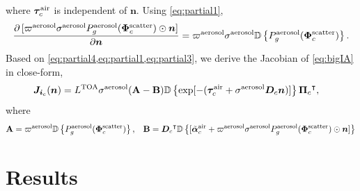 \documentclass[10pt,letterpaper]{article}
\newcommand{\abbrev}[1]{\rm{#1}}
\newcommand{\PartDeriv}[2]{\frac{\partial{#1}}{\partial{#2}}}
\newcommand{\vect}[1]{\bm{#1}}
\newcommand{\transpose}[1]{{#1}^\intercal}
\newcommand{\OpDiag}[1]{\mathbb{D}\left\{#1\right\}}
\begin{document}
where $\vect{\tau}_c^{\rm air}$ is independent of ${\bm n}$. Using
\cref{eq:partial1},
\begin{align}
  \label{eq:partial3}
  \PartDeriv{\, [\varpi^{\rm aerosol}\sigma^{\rm aerosol} P^{\rm
      aerosol}_g(\vect{\Phi}^{\rm scatter}_c) \odot{\bm n}]}{\vect{n}}
  = \varpi^{\rm aerosol}\sigma^{\rm aerosol}\OpDiag{P^{\rm
      aerosol}_g(\vect{\Phi}^{\rm scatter}_c)}.
\end{align}
Based on \cref{eq:partial4,eq:partial1,eq:partial3},
we derive the Jacobian of \cref{eq:bigIA} in close-form,
\begin{align}
  {\bm J}_{{\bm i}_c}({\bm n}) &= L^{\rm TOA}{\sigma}^{\rm
    aerosol}({\bf A}-{\bf B}) \OpDiag{\exp[-(\vect{\tau}_c^{\rm air} +
    {\sigma}^{\rm aerosol} {\bm D}_c {\bm n})]}
  \transpose{{\vect{\Pi}}_c} ,
  \label{eq:gradient2}
\end{align}
where
\begin{equation}
  \label{eq:gradient3}
  {\bf A} = \varpi^{\rm aerosol}
  \OpDiag{ P_g^{\rm aerosol}(\vect{\Phi}^{\rm scatter}_c)}
  ,\;\;\;
  {\bf B} = \transpose{{\bm D}_c}
  \OpDiag{[\tilde{\vect{\alpha}}^{\rm air}_c + \varpi^{\rm
      aerosol}\sigma^{\rm aerosol} P^{\rm aerosol}_g(\vect{\Phi}^{\rm
      scatter}_c) \odot{\bm n}    ]}
\end{equation}


\section{Results}
\label{sec:optimization-results}
\end{document}
